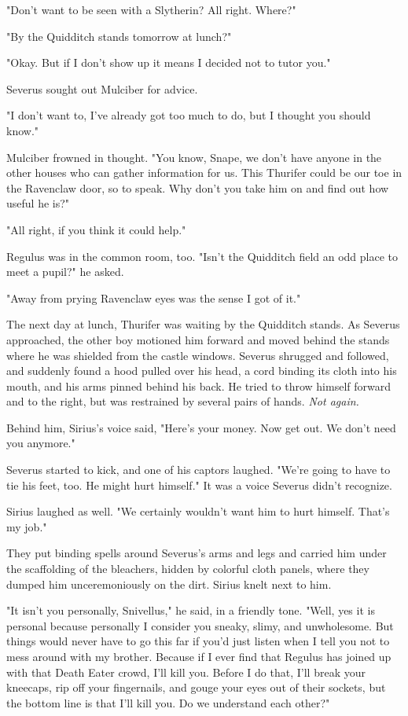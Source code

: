 "Don't want to be seen with a Slytherin? All right. Where?"

"By the Quidditch stands tomorrow at lunch?"

"Okay. But if I don't show up it means I decided not to tutor you."

Severus sought out Mulciber for advice.

"I don't want to, I've already got too much to do, but I thought you should know."

Mulciber frowned in thought. "You know, Snape, we don't have anyone in the other houses who can gather information for us. This Thurifer could be our toe in the Ravenclaw door, so to speak. Why don't you take him on and find out how useful he is?"

"All right, if you think it could help."

Regulus was in the common room, too. "Isn't the Quidditch field an odd place to meet a pupil?" he asked.

"Away from prying Ravenclaw eyes was the sense I got of it."

The next day at lunch, Thurifer was waiting by the Quidditch stands. As Severus approached, the other boy motioned him forward and moved behind the stands where he was shielded from the castle windows. Severus shrugged and followed, and suddenly found a hood pulled over his head, a cord binding its cloth into his mouth, and his arms pinned behind his back. He tried to throw himself forward and to the right, but was restrained by several pairs of hands. \emph{Not again.}

Behind him, Sirius's voice said, "Here's your money. Now get out. We don't need you anymore."

Severus started to kick, and one of his captors laughed. "We're going to have to tie his feet, too. He might hurt himself." It was a voice Severus didn't recognize.

Sirius laughed as well. "We certainly wouldn't want him to hurt himself. That's my job."

They put binding spells around Severus's arms and legs and carried him under the scaffolding of the bleachers, hidden by colorful cloth panels, where they dumped him unceremoniously on the dirt. Sirius knelt next to him.

"It isn't you personally, Snivellus," he said, in a friendly tone. "Well, yes it is personal because personally I consider you sneaky, slimy, and unwholesome. But things would never have to go this far if you'd just listen when I tell you not to mess around with my brother. Because if I ever find that Regulus has joined up with that Death Eater crowd, I'll kill you. Before I do that, I'll break your kneecaps, rip off your fingernails, and gouge your eyes out of their sockets, but the bottom line is that I'll kill you. Do we understand each other?"

